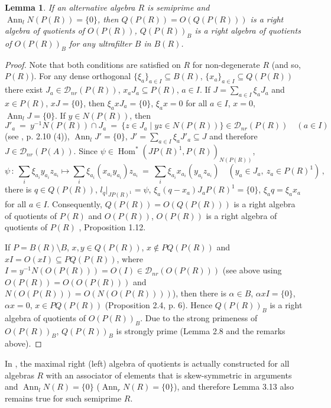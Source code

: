 \documentclass[a4paper,11pt]{article}
\newtheorem{lemma}[defi]{Lemma}
\DeclareMathOperator{\Hom}{Hom}
\DeclareMathOperator{\Ann}{Ann}
\begin{document}
\begin{lemma}
If an alternative algebra $R$ is semiprime and ${\Ann_l N(P(R))=\{0\}}$, then 
${Q(P(R))=O(Q(P(R)))}$ is a right algebra of quotients of $O(P(R))$, 
$Q(P(R))_B$ is a right algebra of quotients of $O(P(R))_B$ for any 
ultrafilter $B$ in $B(R)$.
\end{lemma}

\begin{proof}
Note that both conditions are satisfied on $R$ for non-degenerate $R$ (and 
so, $P(R)$). For any dense orthogonal ${\{\xi_a\}_{a\in I}\subseteq B(R)}$, 
${\{x_a\}_{a\in I}\subseteq Q(P(R))}$ there 
exist ${J_a\in \mathcal{D}_{nr}(P(R))}$, ${x_a J_a\subseteq P(R)}$, 
${a\in I}$. If ${J=\sum\limits_{a\in I} \xi_a J_a}$ and ${x\in P(R)}$, 
${x J=\{0\}}$, then ${\xi_a x J_a=\{0\}}$, ${\xi_a x=0}$ for 
all ${a\in I}$, ${x=0}$, ${\Ann_l J=\{0\}}$. If ${y\in N(P(R))}$, then 
\[
J'_a\ =\ y^{-1} N(P(R))\cap J_a\ =\ \{z\in J_a\mid y z\in N(P(R))\}\in 
\mathcal{D}_{nr}(P(R))\quad (a\in I)
\] 
(see \cite{MLQA}, p. 2.10 (4)), ${\Ann_l J'=\{0\}}$, 
${J'=\sum\limits_{a\in I} \xi_a J'_a\subseteq J}$ 
and therefore ${J\in \mathcal{D}_{nr}(P(A))}$. Since 
${\psi\in \Hom^*(J P(R)^1, P(R))_{N(P(R))}}$, 
\[
\psi\,:\ \sum_i \xi_{a_i} y_{a_i} z_{a_i}\longmapsto 
\sum_i \xi_{a_i} (x_{a_i} y_{a_i}) z_{a_i}\ =\ 
\sum_i \xi_{a_i} x_{a_i} (y_{a_i} z_{a_i})\quad (y_a\in J_a,\ z_a\in P(R)^1)\,,
\]
there is ${q\in Q(P(R))}$, ${l_q|_{J P(R)^1}=\psi}$, 
${\xi_a (q-x_a) J_a P(R)^1=\{0\}}$, ${\xi_a q=\xi_a x_a}$ for all ${a\in I}$. 
Consequently, ${Q(P(R))=O(Q(P(R)))}$ is a right algebra of quotients of 
$P(R)$ and $O(P(R))$, $O(P(R))$ is a right algebra of quotients of $P(R)$ 
\cite{MLQA}, Proposition 1.12. 
 
If ${P=B(R)\setminus B}$, ${x, y\in Q(P(R))}$, ${x\notin P Q(P(R))}$ and 
${x I=O(x I)\subseteq P Q(P(R))}$, where  
${I=y^{-1} N(O(P(R)))=O(I)\in \mathcal{D}_{nr}(O(P(R)))}$ (see above using 
${O(P(R))=O(O(P(R)))}$ and ${N(O(P(R)))=O(N(O(P(R))))}$), then 
there is ${\alpha\in B}$, ${\alpha x I=\{0\}}$, ${\alpha x=0}$, 
${x\in P Q(P(R))}$ (Proposition 2.4, p. 6). Hence $Q(P(R))_B$ is a right 
algebra of quotients of $O(P(R))_B$. Due to the strong primeness of 
$O(P(R))_B$, $Q(P(R))_B$ is strongly prime (Lemma 2.8 and the remarks above).
\end{proof}

In \cite{MLQA}, the maximal right (left) algebra of quotients is actually 
constructed for all algebras $R$ with an associator of elements that is 
skew-symmetric in arguments and ${\Ann_l N(R)=\{0\}}$ (${\Ann_r N(R)=\{0\}}$), 
and therefore Lemma 3.13 also remains true for such semiprime $R$.
\end{document}
